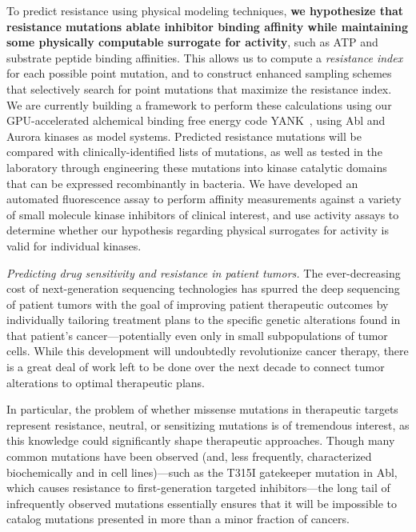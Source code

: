 \documentclass[10pt]{article}
\begin{document}
To predict resistance using physical modeling techniques, {\bf we hypothesize that resistance mutations ablate inhibitor binding affinity while maintaining some physically computable surrogate for activity}, such as ATP and substrate peptide binding affinities.
This allows us to compute a \emph{resistance index} for each possible point mutation, and to construct enhanced sampling schemes that selectively search for point mutations that maximize the resistance index.
We are currently building a framework to perform these calculations using our GPU-accelerated alchemical binding free energy code YANK~\cite{yank}, using Abl and Aurora kinases as model systems.
Predicted resistance mutations will be compared with clinically-identified lists of mutations, as well as tested in the laboratory through engineering these mutations into kinase catalytic domains that can be expressed recombinantly in bacteria.
We have developed an automated fluorescence assay to perform affinity measurements against a variety of small molecule kinase inhibitors of clinical interest, and use activity assays to determine whether our hypothesis regarding physical surrogates for activity is valid for individual kinases.

\emph{Predicting drug sensitivity and resistance in patient tumors.}
The ever-decreasing cost of next-generation sequencing technologies has spurred the deep sequencing of patient tumors with the goal of improving patient therapeutic outcomes by individually tailoring treatment plans to the specific genetic alterations found in that patient's cancer---potentially even only in small subpopulations of tumor cells.
While this development will undoubtedly revolutionize cancer therapy, there is a great deal of work left to be done over the next decade to connect tumor alterations to optimal therapeutic plans.

In particular, the problem of whether missense mutations in therapeutic targets represent resistance, neutral, or sensitizing mutations is of tremendous interest, as this knowledge could significantly shape therapeutic approaches.
Though many common mutations have been observed (and, less frequently, characterized biochemically and in cell lines)---such as the T315I gatekeeper mutation in Abl, which causes resistance to first-generation targeted inhibitors---the long tail of infrequently observed mutations essentially ensures that it will be impossible to catalog mutations presented in more than a minor fraction of cancers.
\end{document}
